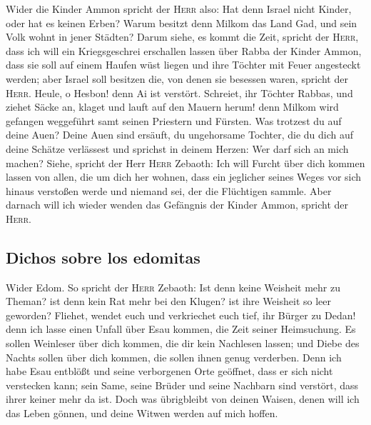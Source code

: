  Wider die Kinder Ammon spricht der \textsc{Herr} also:
Hat denn Israel nicht Kinder, oder hat es keinen Erben? Warum besitzt
denn Milkom das Land Gad, und sein Volk wohnt in jener Städten?
 Darum siehe, es kommt die Zeit, spricht der
\textsc{Herr}, dass ich will ein Kriegsgeschrei erschallen lassen über
Rabba der Kinder Ammon, dass sie soll auf einem Haufen wüst liegen und
ihre Töchter mit Feuer angesteckt werden; aber Israel soll besitzen die,
von denen sie besessen waren, spricht der \textsc{Herr}. 
Heule, o Hesbon! denn Ai ist verstört. Schreiet, ihr Töchter Rabbas, und
ziehet Säcke an, klaget und lauft auf den Mauern herum! denn Milkom wird
gefangen weggeführt samt seinen Priestern und Fürsten. 
Was trotzest du auf deine Auen? Deine Auen sind ersäuft, du ungehorsame
Tochter, die du dich auf deine Schätze verlässest und sprichst in deinem
Herzen: Wer darf sich an mich machen?  Siehe, spricht der
Herr \textsc{Herr} Zebaoth: Ich will Furcht über dich kommen lassen von
allen, die um dich her wohnen, dass ein jeglicher seines Weges vor sich
hinaus verstoßen werde und niemand sei, der die Flüchtigen sammle.
 Aber darnach will ich wieder wenden das Gefängnis der
Kinder Ammon, spricht der \textsc{Herr}.

\hypertarget{dichos-sobre-los-edomitas}{%
\subsection{Dichos sobre los edomitas}\label{dichos-sobre-los-edomitas}}

 Wider Edom. So spricht der \textsc{Herr} Zebaoth: Ist
denn keine Weisheit mehr zu Theman? ist denn kein Rat mehr bei den
Klugen? ist ihre Weisheit so leer geworden?  Fliehet,
wendet euch und verkriechet euch tief, ihr Bürger zu Dedan! denn ich
lasse einen Unfall über Esau kommen, die Zeit seiner Heimsuchung.
 Es sollen Weinleser über dich kommen, die dir kein
Nachlesen lassen; und Diebe des Nachts sollen über dich kommen, die
sollen ihnen genug verderben.  Denn ich habe Esau
entblößt und seine verborgenen Orte geöffnet, dass er sich nicht
verstecken kann; sein Same, seine Brüder und seine Nachbarn sind
verstört, dass ihrer keiner mehr da ist.  Doch was
übrigbleibt von deinen Waisen, denen will ich das Leben gönnen, und
deine Witwen werden auf mich hoffen.

